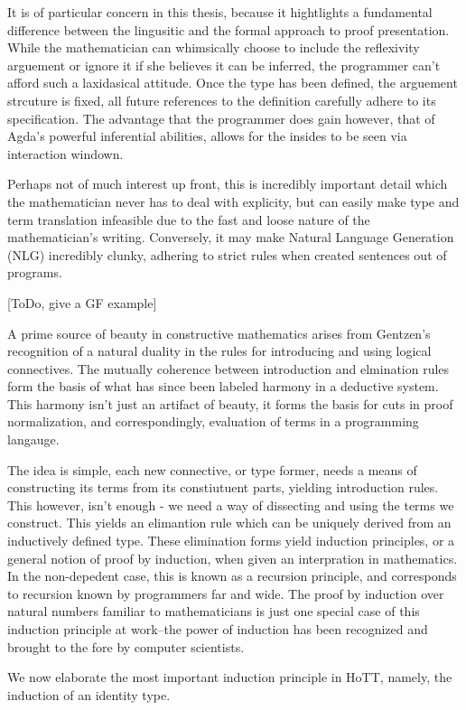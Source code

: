 It is of particular concern in this thesis, because it hightlights a
fundamental difference between the lingusitic and the formal approach to proof
presentation.  While the mathematician can whimsically choose to include the
reflexivity arguement or ignore it if she believes it can be inferred, the
programmer can't afford such a laxidasical attitude. Once the type has been
defined, the arguement strcuture is fixed, all future references to the
definition carefully adhere to its specification. The advantage that the
programmer does gain however, that of Agda's powerful inferential abilities,
allows for the insides to be seen via interaction windown. 

Perhaps not of much interest up front, this is incredibly important detail
which the mathematician never has to deal with explicity, but can easily make
type and term translation infeasible due to the fast and loose nature of the
mathematician's writing. Conversely, it may make Natural Language Generation
(NLG) incredibly clunky, adhering to strict rules when created sentences out of
programs. 

[ToDo, give a GF example]

A prime source of beauty in constructive mathematics arises from Gentzen's
recognition of a natural duality in the rules for introducing and using logical
connectives. The mutually coherence between introduction and elmination rules
form the basis of what has since been labeled harmony in a deductive system.
This harmony isn't just an artifact of beauty, it forms the basis for cuts in
proof normalization, and correspondingly, evaluation of terms in a programming
langauge. 

The idea is simple, each new connective, or type former, needs a means of
constructing its terms from its constiutuent parts, yielding introduction
rules. This however, isn't enough - we need a way of dissecting and using the
terms we construct. This yields an elimantion rule which can be uniquely
derived from an inductively defined type. These elimination forms yield
induction principles, or a general notion of proof by induction, when given an
interpration in mathematics. In the non-depedent case, this is known as a
recursion principle, and corresponds to recursion known by programmers far and
wide.  The proof by induction over natural numbers familiar to mathematicians
is just one special case of this induction principle at work--the power of
induction has been recognized and brought to the fore by computer scientists.

We now elaborate the most important induction principle in HoTT, namely, the
induction of an identity type.

